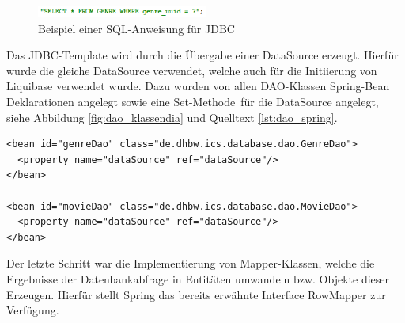 	\begin{figure}[H]
		\centering 
		\includegraphics[width=0.5\textwidth]{img/select_beispiel}
		\captionsetup{format=hang}
		\caption[Beispiel einer SQL-Anweisung für JDBC]{\label{fig:select_beispiel}Beispiel einer SQL-Anweisung für \ac{JDBC}}
	\end{figure}
	
	Das \ac{JDBC}-Template wird durch die Übergabe einer DataSource erzeugt. Hierfür wurde die gleiche DataSource verwendet, welche auch für die Initiierung von Liquibase verwendet wurde. Dazu wurden von allen  \ac{DAO}-Klassen Spring-Bean Deklarationen angelegt sowie eine \glqq Set-Methode\grqq \, für die DataSource angelegt, siehe Abbildung \ref{fig:dao_klassendia} und Quelltext \ref{lst:dao_spring}.
	
	
\begin{lstlisting}[caption={Beispiel für die Spring-Bean-Deklaration von DAO-Objekten}, label={lst:dao_spring}, basicstyle=\ttfamily\fontsize{10}{12}\selectfont]
<bean id="genreDao" class="de.dhbw.ics.database.dao.GenreDao">
  <property name="dataSource" ref="dataSource"/>
</bean>

<bean id="movieDao" class="de.dhbw.ics.database.dao.MovieDao">
  <property name="dataSource" ref="dataSource"/>
</bean>
\end{lstlisting}	
	
	Der letzte Schritt war die Implementierung von Mapper-Klassen, welche die Ergebnisse der Datenbankabfrage in Entitäten umwandeln bzw. Objekte dieser Erzeugen. Hierfür stellt Spring das bereits erwähnte Interface RowMapper zur Verfügung. 
	
